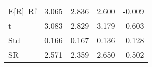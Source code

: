 \begin{tabular}{lrrrr}
\toprule
\midrule
E[R]--Rf & 3.065 & 2.836 & 2.600 & -0.009 \\
t & 3.083 & 2.829 & 3.179 & -0.603 \\
Std & 0.166 & 0.167 & 0.136 & 0.128 \\
SR & 2.571 & 2.359 & 2.650 & -0.502 \\
\bottomrule
\end{tabular}
